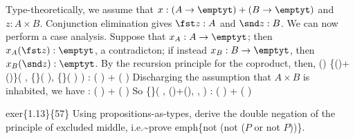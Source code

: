 Type-theoretically, we assume that $x : (A \to\emptyt) + (B \to\emptyt)$ and $z
: A \times B$.  Conjunction elimination gives $\fst z : A$ and $\snd z : B$.
We can now perform a case analysis.  Suppose that $x_{A} : A \to \emptyt$; then
$x_{A}(\fst z) : \emptyt$, a contradicton; if instead $x_{B} : B \to \emptyt$,
then $x_{B}(\snd z) : \emptyt$.  By the recursion principle for the coproduct,
then,
  ()  \{()+()\}(
    ,
    \{\}( ),
    \{\}( )
  )
  :
  (  ) + (  )  
Discharging the assumption that $A \times B$ is inhabited, we have
   : 
      (  ) + (  )  
So
  \{\}( , ()+(), , )
  :
  (  ) + (  ) 
     
   


exer\{1.13\}\{57\}  Using propositions-as-types, derive the double negation of the
principle of excluded middle, i.e.\~{}prove emph\{not (not ($P$ or not $P$))\}.


